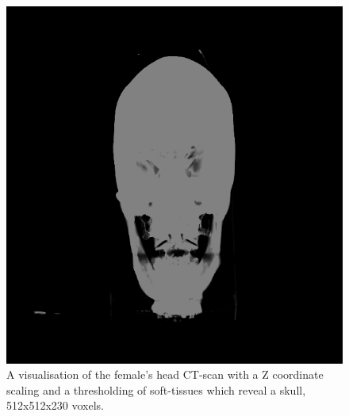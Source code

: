 \documentclass[twoside, english, 11pt]{report}
\begin{document}
\begin{figure}[H]
\centerline{\includegraphics[scale = 0.44]{img/head-th}}
\caption{A visualisation of the female's head CT-scan with a Z coordinate scaling and a thresholding of soft-tissues which reveal a skull, 512x512x230 voxels.\label{fig:head-th}}
\end{figure}
\end{document}

